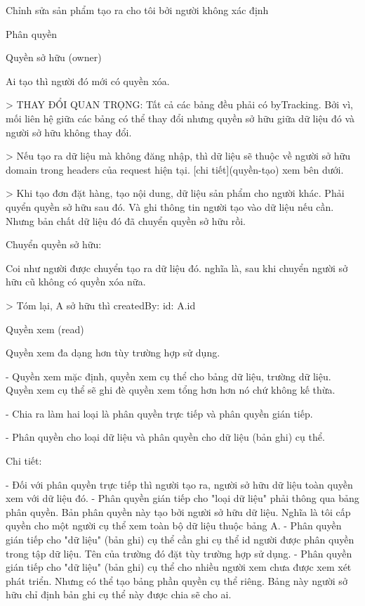 \documentclass{report}
\begin{document}
Chỉnh sửa sản phẩm tạo ra cho tôi bởi người không xác định



 Phân quyền

Quyền sở hữu (owner)

Ai tạo thì người đó mới có quyền xóa.

> THAY ĐỔI QUAN TRỌNG: Tất cả các bảng đều phải có byTracking. Bởi vì, mối liên hệ giữa các bảng có thể thay đổi nhưng quyền sở hữu giữa dữ liệu đó và người sở hữu không thay đổi.

> Nếu tạo ra dữ liệu mà không đăng nhập, thì dữ liệu sẽ thuộc về người sở hữu domain trong headers của request hiện tại. [chi tiết](quyền-tạo) xem bên dưới.

> Khi tạo đơn đặt hàng, tạo nội dung, dữ liệu sản phẩm cho người khác. Phải quyển quyền sở hữu sau đó. Và ghi thông tin người tạo vào dữ liệu nếu cần. Nhưng bản chất dữ liệu đó đã chuyển quyền sở hữu rồi.

Chuyển quyền sở hữu:

Coi như người được chuyển tạo ra dữ liệu đó.
nghĩa là, sau khi chuyển người sở hữu cũ không có quyền xóa nữa.

> Tóm lại, A sở hữu thì createdBy: { id: A.id }

Quyền xem (read)

Quyền xem đa dạng hơn tùy trường hợp sử dụng.

- Quyền xem mặc định, quyền xem cụ thể cho bảng dữ liệu, trường dữ liệu. Quyền xem cụ thể sẽ ghi đè quyền xem tổng hơn hơn nó chứ không kế thừa.

- Chia ra làm hai loại là phân quyền trực tiếp và phân quyền gián tiếp.

- Phân quyền cho loại dữ liệu và phân quyền cho dữ liệu (bản ghi) cụ thể.

Chi tiết:

- Đối với phân quyền trực tiếp thì người tạo ra, người sở hữu dữ liệu toàn quyền xem với dữ liệu đó.
- Phân quyền gián tiếp cho "loại dữ liệu" phải thông qua bảng phân quyền. Bản phân quyền này tạo bởi người sở hữu dữ liệu. Nghĩa là tôi cấp quyền cho một người cụ thể xem toàn bộ dữ liệu thuộc bảng A.
- Phân quyền gián tiếp cho "dữ liệu" (bản ghi) cụ thể cần ghi cụ thể id người được phân quyền trong tập dữ liệu. Tên của trường đó đặt tùy trường hợp sử dụng.
- Phân quyền gián tiếp cho "dữ liệu" (bản ghi) cụ thể cho nhiều người xem chưa được xem xét phát triển. Nhưng có thể tạo bảng phần quyền cụ thể riêng. Bảng này người sở hữu chỉ định bản ghi cụ thể này được chia sẽ cho ai.
\end{document}
